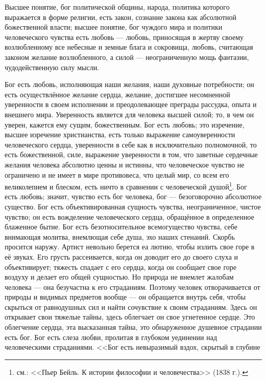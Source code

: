 \documentclass[12pt,oneside]{book}
\begin{document}
Высшее понятие, бог политической общины, народа, политика которого выражается в форме религии, есть закон, сознание закона как абсолютной божественной власти; высшее понятие, бог чуждого мира и политики человеческого чувства есть любовь --- любовь, приносящая в жертву своему возлюбленному все небесные и земные блага и сокровища, любовь, считающая законом желание возлюбленного, а силой --- неограниченную мощь фантазии, чудодейственную силу мысли.

Бог есть любовь, исполняющая наши желания, наши духовные потребности; он есть осуществлённое желание сердца, желание, достигшее несомненной уверенности в своем исполнении и преодолевающее преграды рассудка, опыта и внешнего мира. Уверенность является для человека высшей силой; то, в чем он уверен, кажется ему сущим, божественным. Бог есть любовь; это изречение, высшее изречение христианства, есть только выражение самоуверенности человеческого сердца, уверенности в себе как в исключительно полномочной, то есть божественной, силе, выражение уверенности в том, что заветные сердечные желания человека абсолютно ценны и истинны, что человеческое чувство не ограничено и не имеет в мире противовеса, что целый мир, со всем его великолепием и блеском, есть ничто в сравнении с человеческой душой\ddag\let\svthefootnote\thefootnote\let\thefootnote\relax{}\let\thefootnote\svthefootnote\footnote{см.: <<Пьер Бейль. К истории философии и человечества>> (1838 г.).}. Бог есть любовь; значит, чувство есть бог человека, бог --- безоговорочно абсолютное существо. Бог есть объективированная сущность чувства, неограниченное, чистое чувство; он есть вожделение человеческого сердца, обращённое в определенное блаженное бытие. Бог есть безотносительное всемогущество чувства, себе внимающая молитва, внемлющая себе душа, эхо наших стенаний. Скорбь просится наружу. Артист невольно берется еа лютню, чтобы излить свое горе в её звуках. Его грусть рассеивается, когда он доводит его до своего слуха и объективирует; тяжесть спадает с его сердца, когда он сообщает свое горе воздуху и делает его общей сущностью. Но природа не внемлет жалобам человека --- она безучастна к его страданиям. Поэтому человек отворачивается от природы и видимых предметов вообще --- он обращается внутрь себя, чтобы скрыться от равнодушных сил и найти сочувствие к своим страданиям. Здесь он открывает свои тяжелые тайны, здесь облегчает он свое угнетенное сердце. Это облегчение сердца, эта высказанная тайна, это обнаруженное душевное страдании есть бог. Бог есть слеза любви, пролитая в глубоком уединении над человеческими страданиями. <<Бог есть невыразимый вздох, скрытый в глубине 
\end{document}
